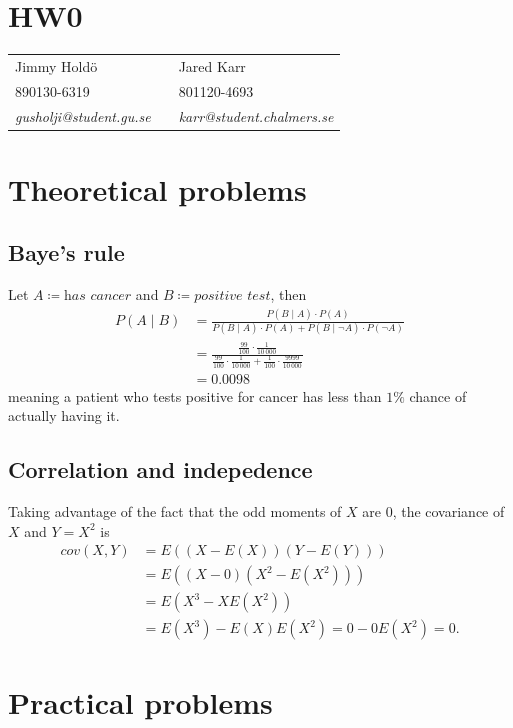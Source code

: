 \documentclass[a4paper,11pt]{article}
\DeclareMathOperator{\given}{\mid}
\begin{document}
\section*{HW0}

\begin{tabular*}{0.9\textwidth}{@{\extracolsep{\fill} } lll}
Jimmy Hold\"{o} & & Jared Karr\\
890130-6319 & & 801120-4693\\
\it{gusholji@student.gu.se} & & \it{karr@student.chalmers.se}\\
\end{tabular*}

\section{Theoretical problems}
\subsection{Baye's rule}
Let $A\coloneqq\textit{has cancer}$ and $B\coloneqq\textit{positive test}$, then
\begin{align*}
P(A \given B) &= \frac{P(B \given A)\cdot P(A)}{P(B \given A)\cdot P(A)+P(B \given \neg A)\cdot P(\neg A)}  \\
              &= \frac{\frac{99}{100}\cdot\frac{1}{10\,000}}{\frac{99}{100}\cdot\frac{1}{10\,000}+\frac{1}{100}\cdot\frac{9999}{10\,000}} \\
              &= 0.0098
\end{align*}
meaning a patient who tests positive for cancer has less than $1\%$ chance of actually having it.

\subsection{Correlation and indepedence}
Taking advantage of the fact that the odd moments of $X$ are 0, the covariance of $X$ and $Y=X^2$ is
\begin{align*}
	cov(X, Y) &= E\left(\left(X-E(X)\right)\left(Y-E(Y)\right)\right) \\
	&=E\left(\left(X-0\right)\left(X^2-E(X^2)\right)\right) \\
	&=E\left(X^3-XE(X^2)\right) \\
	&=E(X^3)-E(X)E(X^2)=0 - 0E(X^2)=0.
\end{align*}
\clearpage
\section{Practical problems}
\end{document}

